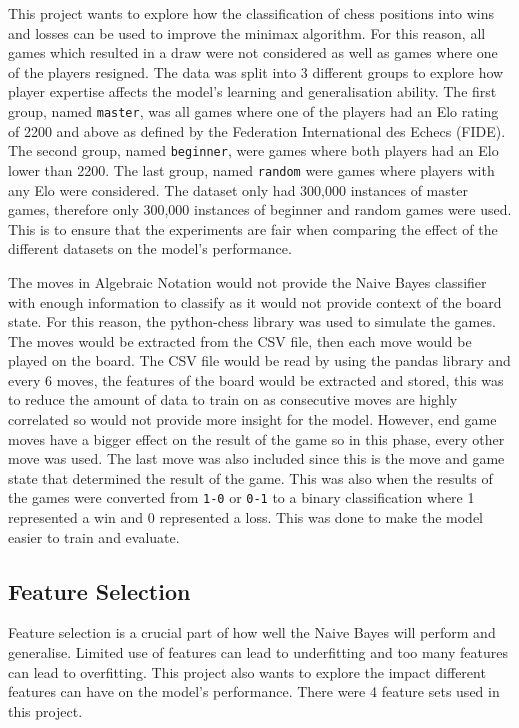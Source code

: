 This project wants to explore how the classification of chess positions into wins and losses can be used to improve the minimax algorithm. For this reason, all games which resulted in a draw were not considered as well as games where one of the players resigned. The data was split into 3 different groups to explore how player expertise affects the model's learning and generalisation ability. The first group, named \texttt{master}, was all games where one of the players had an Elo rating of 2200 and above as defined by the Federation International des Echecs (FIDE). The second group, named \texttt{beginner}, were games where both players had an Elo lower than 2200. The last group, named \texttt{random} were games where players with any Elo were considered. The dataset only had 300,000 instances of master games, therefore only 300,000 instances of beginner and random games were used. This is to ensure that the experiments are fair when comparing the effect of the different datasets on the model's performance. 

The moves in Algebraic Notation would not provide the Naive Bayes classifier with enough information to classify as it would not provide context of the board state. For this reason, the python-chess library was used to simulate the games. The moves would be extracted from the CSV file, then each move would be played on the board. The CSV file would be read by using the pandas library and every 6 moves, the features of the board would be extracted and stored, this was to reduce the amount of data to train on as consecutive moves are highly correlated so would not provide more insight for the model. However, end game moves have a bigger effect on the result of the game so in this phase, every other move was used. The last move was also included since this is the move and game state that determined the result of the game. This was also when the results of the games were converted from \texttt{1-0} or \texttt{0-1} to a binary classification where 1 represented a win and 0 represented a loss. This was done to make the model easier to train and evaluate.

\subsection{Feature Selection}

Feature selection is a crucial part of how well the Naive Bayes will perform and generalise. Limited use of features can lead to underfitting and too many features can lead to overfitting. This project also wants to explore the impact different features can have on the model's performance. There were 4 feature sets used in this project. 

